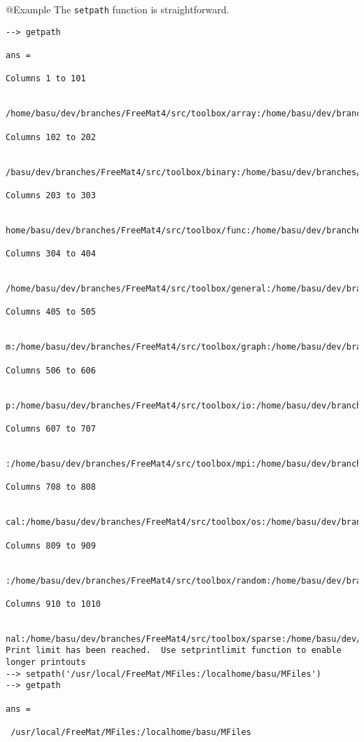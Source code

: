 @Example
The \verb|setpath| function is straightforward.
\begin{verbatim}
--> getpath

ans = 
 
Columns 1 to 101

 /home/basu/dev/branches/FreeMat4/src/toolbox/array:/home/basu/dev/branches/FreeMat4/src/toolbox:/home
 
Columns 102 to 202

 /basu/dev/branches/FreeMat4/src/toolbox/binary:/home/basu/dev/branches/FreeMat4/src/toolbox/fitting:/
 
Columns 203 to 303

 home/basu/dev/branches/FreeMat4/src/toolbox/func:/home/basu/dev/branches/FreeMat4/src/toolbox/funfun:
 
Columns 304 to 404

 /home/basu/dev/branches/FreeMat4/src/toolbox/general:/home/basu/dev/branches/FreeMat4/src/toolbox/geo
 
Columns 405 to 505

 m:/home/basu/dev/branches/FreeMat4/src/toolbox/graph:/home/basu/dev/branches/FreeMat4/src/toolbox/hel
 
Columns 506 to 606

 p:/home/basu/dev/branches/FreeMat4/src/toolbox/io:/home/basu/dev/branches/FreeMat4/src/toolbox/matrix
 
Columns 607 to 707

 :/home/basu/dev/branches/FreeMat4/src/toolbox/mpi:/home/basu/dev/branches/FreeMat4/src/toolbox/numeri
 
Columns 708 to 808

 cal:/home/basu/dev/branches/FreeMat4/src/toolbox/os:/home/basu/dev/branches/FreeMat4/src/toolbox/poly
 
Columns 809 to 909

 :/home/basu/dev/branches/FreeMat4/src/toolbox/random:/home/basu/dev/branches/FreeMat4/src/toolbox/sig
 
Columns 910 to 1010

 nal:/home/basu/dev/branches/FreeMat4/src/toolbox/sparse:/home/basu/dev/branches/FreeMat4/sr
Print limit has been reached.  Use setprintlimit function to enable longer printouts
--> setpath('/usr/local/FreeMat/MFiles:/localhome/basu/MFiles')
--> getpath

ans = 

 /usr/local/FreeMat/MFiles:/localhome/basu/MFiles
\end{verbatim}
